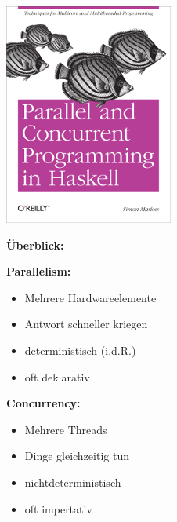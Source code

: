 \documentclass{beamer}
\begin{document}

\begin{frame}

\begin{center}
\includegraphics[scale=1]{../Woche6/parcur.png} 
\end{center}

\end{frame}


\begin{frame}

\textbf{Überblick:}
\pause

\begin{multicols}{2}
\textbf{Parallelism:}
\begin{itemize}
\item Mehrere Hardwareelemente\pause
\item Antwort schneller kriegen\pause
\item deterministisch (i.d.R.)\pause
\item oft deklarativ\pause
\end{itemize}
\columnbreak
\textbf{Concurrency:}
\begin{itemize}
\item Mehrere Threads\pause
\item Dinge gleichzeitig tun\pause
\item nichtdeterministisch\pause
\item oft impertativ
\end{itemize}
\end{multicols}

\end{frame}
\end{document}
